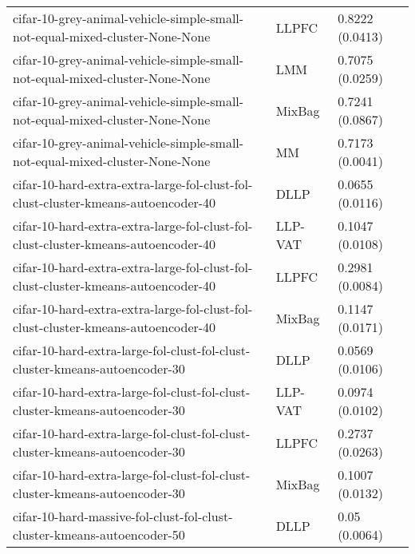 \begin{longtable}{lll}
                                  cifar-10-grey-animal-vehicle-simple-small-not-equal-mixed-cluster-None-None &     LLPFC &                       0.8222 (0.0413) \\
                                  cifar-10-grey-animal-vehicle-simple-small-not-equal-mixed-cluster-None-None &       LMM &                       0.7075 (0.0259) \\
                                  cifar-10-grey-animal-vehicle-simple-small-not-equal-mixed-cluster-None-None &    MixBag &                       0.7241 (0.0867) \\
                                  cifar-10-grey-animal-vehicle-simple-small-not-equal-mixed-cluster-None-None &        MM &                       0.7173 (0.0041) \\
                            cifar-10-hard-extra-extra-large-fol-clust-fol-clust-cluster-kmeans-autoencoder-40 &      DLLP &                       0.0655 (0.0116) \\
                            cifar-10-hard-extra-extra-large-fol-clust-fol-clust-cluster-kmeans-autoencoder-40 &   LLP-VAT &                       0.1047 (0.0108) \\
                            cifar-10-hard-extra-extra-large-fol-clust-fol-clust-cluster-kmeans-autoencoder-40 &     LLPFC &                       0.2981 (0.0084) \\
                            cifar-10-hard-extra-extra-large-fol-clust-fol-clust-cluster-kmeans-autoencoder-40 &    MixBag &                       0.1147 (0.0171) \\
                                  cifar-10-hard-extra-large-fol-clust-fol-clust-cluster-kmeans-autoencoder-30 &      DLLP &                       0.0569 (0.0106) \\
                                  cifar-10-hard-extra-large-fol-clust-fol-clust-cluster-kmeans-autoencoder-30 &   LLP-VAT &                       0.0974 (0.0102) \\
                                  cifar-10-hard-extra-large-fol-clust-fol-clust-cluster-kmeans-autoencoder-30 &     LLPFC &                       0.2737 (0.0263) \\
                                  cifar-10-hard-extra-large-fol-clust-fol-clust-cluster-kmeans-autoencoder-30 &    MixBag &                       0.1007 (0.0132) \\
                                      cifar-10-hard-massive-fol-clust-fol-clust-cluster-kmeans-autoencoder-50 &      DLLP &                         0.05 (0.0064) \\

\end{longtable}
